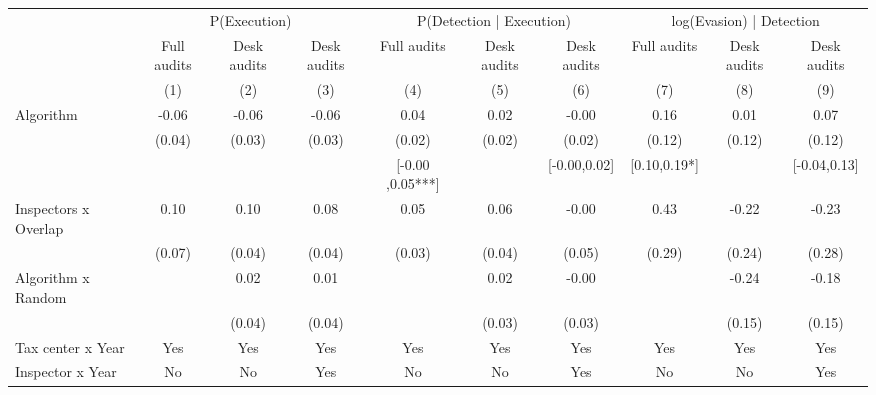 \begin{tabular}{lccc|ccc|ccc} \toprule
\multicolumn{1}{l}{} & \multicolumn{3}{c}{P(Execution)} & \multicolumn{3}{c}{P(Detection | Execution)} & \multicolumn{3}{c}{log(Evasion) | Detection} \\\cmidrule(lr){2-4}\cmidrule(lr){5-7}\cmidrule(lr){8-10} \multicolumn{1}{l}{} & Full audits & Desk audits & Desk audits & Full audits & Desk audits & Desk audits & Full audits & Desk audits & Desk audits \\ \multicolumn{1}{l}{} & (1) & (2) & (3) & (4) & (5) & (6) & (7) & (8) & (9) \\ \midrule
Algorithm   &       -0.06\sym{*}  &       -0.06\sym{**} &       -0.06\sym{**} &        0.04\sym{**} &        0.02         &       -0.00         &        0.16         &        0.01         &        0.07         \\
            &      (0.04)         &      (0.03)         &      (0.03)         &      (0.02)         &      (0.02)         &      (0.02)         &      (0.12)         &      (0.12)         &      (0.12)         \\
\addlinespace
 & & & & [-0.00 ,0.05***] & & [-0.00,0.02] & [0.10,0.19*] & & [-0.04,0.13] \\  Inspectors x Overlap&        0.10         &        0.10\sym{**} &        0.08\sym{*}  &        0.05         &        0.06\sym{*}  &       -0.00         &        0.43         &       -0.22         &       -0.23         \\
            &      (0.07)         &      (0.04)         &      (0.04)         &      (0.03)         &      (0.04)         &      (0.05)         &      (0.29)         &      (0.24)         &      (0.28)         \\
\addlinespace
Algorithm x Random&                     &        0.02         &        0.01         &                     &        0.02         &       -0.00         &                     &       -0.24         &       -0.18         \\
            &                     &      (0.04)         &      (0.04)         &                     &      (0.03)         &      (0.03)         &                     &      (0.15)         &      (0.15)         \\
\midrule
Tax center x Year&         Yes         &         Yes         &         Yes         &         Yes         &         Yes         &         Yes         &         Yes         &         Yes         &         Yes         \\
Inspector x Year&          No         &          No         &         Yes         &          No         &          No         &         Yes         &          No         &          No         &         Yes         \\

\end{tabular}

